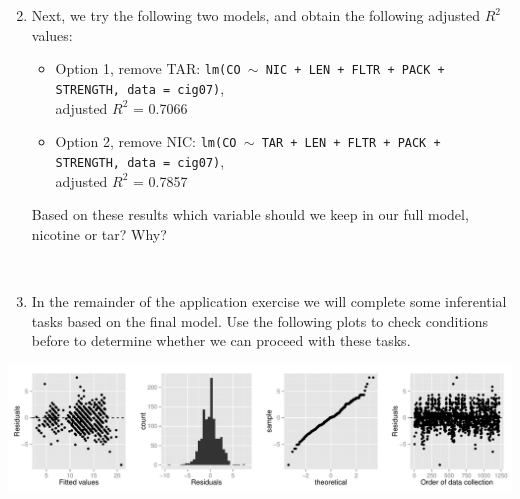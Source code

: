 \documentclass[12pt]{article}
\newcommand{\soln}[2]{$\:$\\ \vspace{#1}}{}
\begin{document}
\begin{enumerate}
\soln{3cm}{
Yes, according to this model output, as nicotine increases CO emission decreases. But we know from the pairs plot that nicotine and CO are
positively associated. This is likely due to multicollinearity in the model -- nicotine and tar are strongly correlated, resulting in unreliable
slope estimates.
}

$\:$

%

\item Next, we try the following two models, and obtain the following adjusted $R^2$ values:
\begin{itemize}
\item Option 1, remove TAR: \texttt{lm(CO $\sim$ NIC + LEN + FLTR + PACK + STRENGTH, data = cig07)}, \\
adjusted $R^2$ = 0.7066
\item Option 2, remove NIC: \texttt{lm(CO $\sim$ TAR + LEN + FLTR + PACK + STRENGTH, data = cig07)}, \\
adjusted $R^2$ = 0.7857
\end{itemize}
Based on these results which variable should we keep in our full model, nicotine or tar? Why?

\soln{1cm}{Remove nicotine, higher adjusted $R^2$.}

%

\pagebreak

\item In the remainder of the application exercise we will complete some inferential tasks based on the
final model. Use the following plots to check conditions before to determine whether we can proceed with these tasks.

\end{enumerate}

\includegraphics[width=\textwidth]{diag.pdf}

\soln{4cm}{
\begin{enumerate}
\item Linearity -- residuals scattered around 0, but there is some structure, may not be met.
\item Nearly normal residuals -- mostly met.
\item Constant variance -- residuals plot does not have an apparent fan shape.
\item Independence -- no apparent structure due to order of data collection, but we would like
to know about data collection methods (i.e. how were these cigarettes selected)
\end{enumerate}
}
\end{document}
